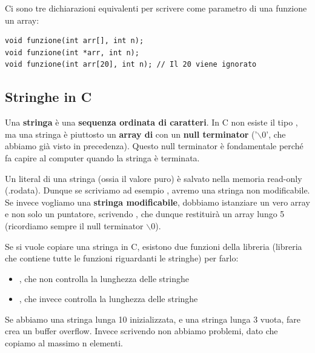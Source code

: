 \documentclass[11pt, a4paper, titlepage, oneside]{scrbook}
\begin{document}
Ci sono tre dichiarazioni equivalenti per scrivere come parametro di una funzione un array:
\begin{lstlisting}[style=C]
void funzione(int arr[], int n);
void funzione(int *arr, int n);
void funzione(int arr[20], int n); // Il 20 viene ignorato 
\end{lstlisting}

\subsection{Stringhe in C}

\begin{Definizione}[Stringa]
\label{def-stringa}
Una \textbf{stringa} è una \textbf{sequenza ordinata di caratteri}. In C non esiste il tipo , ma una stringa è piuttosto un \textbf{array di}  con un \textbf{null terminator} ('$\backslash 0$', che abbiamo già visto in precedenza). Questo null terminator è fondamentale perché fa capire al computer quando la stringa è terminata.
\end{Definizione}

Un literal di una stringa (ossia il valore puro) è salvato nella memoria read-only (.rodata). Dunque se scriviamo ad esempio , avremo una stringa non modificabile. Se invece vogliamo una \textbf{stringa modificabile}, dobbiamo istanziare un vero array e non solo un puntatore, scrivendo , che dunque restituirà un array lungo 5 (ricordiamo sempre il null terminator $\backslash 0$).

\begin{Proprieta}
\label{prop-copiare-stringa}
Se si vuole copiare una stringa in C, esistono due funzioni della libreria  (libreria che contiene tutte le funzioni riguardanti le stringhe) per farlo:
\begin{itemize}
    \item {}, che non controlla la lunghezza delle stringhe
    \item {}, che invece controlla la lunghezza delle stringhe
\end{itemize}
\end{Proprieta}

Se abbiamo una stringa  lunga 10 inizializzata, e una stringa  lunga 3 vuota, fare  crea un buffer overflow. Invece scrivendo \mbox{} non abbiamo problemi, dato che copiamo al massimo n elementi. 
\end{document}
